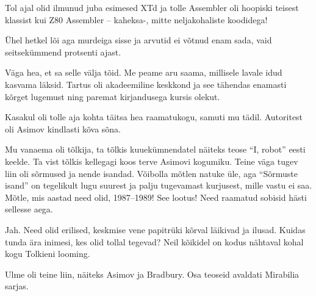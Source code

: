 Tol ajal olid ilmunud juba esimesed XTd ja tolle 
Assembler oli hoopiski teisest klassist kui Z80 Assembler -- kaheksa-, mitte neljakohaliste koodidega! 

Ühel hetkel lõi aga murdeiga sisse ja arvutid ei võtnud enam sada, vaid seitsekümmend protsenti ajast. 


Väga hea, et sa selle välja tõid. Me peame aru saama, millisele lavale 
idud kasvama läksid. Tartus oli akadeemiline keskkond ja see tähendas 
enamasti kõrget lugemust ning paremat kirjandusega kursis olekut.

Kasakul oli tolle aja kohta täitsa hea raamatukogu, 
samuti mu tädil. Autoritest oli Asimov
kindlasti kõva sõna. 

Mu vanaema oli tõlkija, ta tõlkis kuuekümnendatel näiteks teose \enquote{I, 
robot} eesti keelde. Ta vist tõlkis kellegagi koos terve Asimovi 
kogumiku. Teine väga tugev liin oli sõrmused ja nende 
isandad. 
Võibolla mõtlen natuke üle, aga \enquote{Sõrmuste isand} on tegelikult lugu suurest ja palju tugevamast kurjusest, mille 
vastu ei saa. Mõtle, mis aastad need olid, 1987--1989! See lootus! Need 
raamatud sobisid hästi sellesse aega.


Jah. Need olid erilised, keskmise vene papitrüki kõrval läikivad ja ilusad. Kuidas tunda ära 
inimesi, kes olid tollal tegevad? Neil kõikidel on kodus nähtaval kohal kogu Tolkieni looming.

Ulme oli teine liin, näiteks Asimov ja Bradbury. Osa teoseid avaldati Mirabilia sarjas. 


